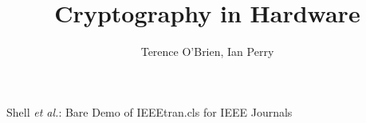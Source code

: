 \documentclass[journal]{IEEEtran}
\begin{document}
%
\title{Cryptography in Hardware}
%
%
%


\author{Terence O'Brien,
        Ian Perry}

% 
%



%
{Shell \MakeLowercase{\textit{et al.}}: Bare Demo of IEEEtran.cls for IEEE Journals}
% 
\end{document}
